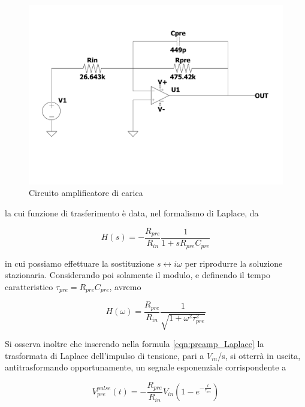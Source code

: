 \documentclass{article}
\begin{document}
\begin{center}
\begin{figure}[H]
\centering
\includegraphics[scale=0.3, angle=0]{preamp.pdf}
\caption{ Circuito amplificatore di carica }
\label{fig:preamp}
\end{figure}
\end{center}

la cui funzione di trasferimento è data, nel formalismo di Laplace, da

\begin{equation}
    \label{eqn:preamp_Laplace}
    H(s) = -\frac{R_{pre}}{R_{in}} \frac{1}{1+sR_{pre}C_{pre}}
\end{equation}

in cui possiamo effettuare la sostituzione $s \longleftrightarrow i\omega$ per riprodurre la soluzione stazionaria. Considerando poi
solamente il modulo, e definendo il tempo caratteristico $\tau_{pre}=R_{pre}C_{pre}$, avremo

\begin{equation}
    \label{eqn:preamp_trasf}
    H(\omega) = \frac{R_{pre}}{R_{in}} \frac{1}{\sqrt{1+\omega^2\tau_{pre}^2}}
\end{equation}

Si osserva inoltre che inserendo nella formula \ref{eqn:preamp_Laplace} la trasformata di Laplace dell'impulso di tensione, pari a 
$V_{in}$/s, si otterrà in uscita, antitrasformando opportunamente, un segnale esponenziale corrispondente a

\begin{equation}
    \label{eqn:Vout1_preamp}
    V_{pre}^{pulse}(t) = -\frac{R_{pre}}{R_{in}}V_{in}(1-e^{-\frac{t}{\tau_{pre}}})
\end{equation}
\end{document}
